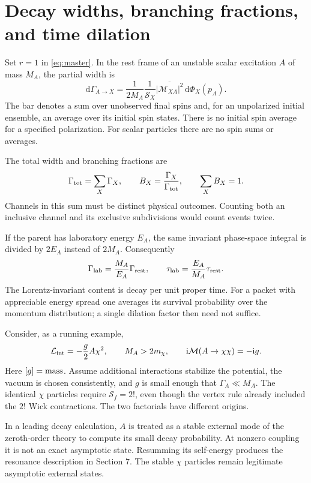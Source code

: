 \documentclass[11pt]{article}
\newcommand{\dd}{\mathrm d}
\newcommand{\ii}{\mathrm i}
\newcommand{\Lag}{\mathcal L}
\newcommand{\module}[1]{\clearpage\section{#1}}
\newcommand{\cM}{\mathcal M}
\newcommand{\cS}{\mathcal S}
\begin{document}
\module{Decay widths, branching fractions, and time dilation}
Set \(r=1\) in \eqref{eq:master}. In the rest frame of an unstable scalar
excitation \(A\) of mass \(M_A\), the partial width is
\begin{equation}
 \boxed{\quad \dd\Gamma_{A\to X}
 =\frac{1}{2M_A}\frac{1}{\cS_X}
 \overline{|\cM_{XA}|^2}\,\dd\Phi_X(p_A).\quad}
 \label{eq:width}
\end{equation}
The bar denotes a sum over unobserved final spins and, for an unpolarized
initial ensemble, an average over its initial spin states. There is no
initial spin average for a specified polarization. For scalar particles
there are no spin sums or averages.

The total width and branching fractions are
\begin{equation}
 \Gamma_{\rm tot}=\sum_X\Gamma_X,\qquad
 B_X=\frac{\Gamma_X}{\Gamma_{\rm tot}},\qquad \sum_XB_X=1.
\end{equation}
Channels in this sum must be distinct physical outcomes. Counting both an
inclusive channel and its exclusive subdivisions would count events twice.

If the parent has laboratory energy \(E_A\), the same invariant phase-space
integral is divided by \(2E_A\) instead of \(2M_A\). Consequently
\begin{equation}
 \Gamma_{\rm lab}=\frac{M_A}{E_A}\Gamma_{\rm rest},\qquad
 \tau_{\rm lab}=\frac{E_A}{M_A}\tau_{\rm rest}.
 \label{eq:dilation}
\end{equation}
The Lorentz-invariant content is decay per unit proper time. For a packet
with appreciable energy spread one averages its survival probability over
the momentum distribution; a single dilation factor then need not suffice.

Consider, as a running example,
\begin{equation}
 \Lag_{\rm int}=-\frac{g}{2}A\chi^2,\qquad M_A>2m_\chi,
 \qquad \ii\cM(A\to\chi\chi)=-\ii g.
 \label{eq:decaymodel}
\end{equation}
Here \([g]={\rm mass}\). Assume additional interactions stabilize the
potential, the vacuum is chosen consistently, and \(g\) is small enough
that \(\Gamma_A\ll M_A\). The identical \(\chi\) particles require
\(\cS_f=2!\), even though the vertex rule already included the \(2!\)
Wick contractions. The two factorials have different origins.

\begin{keyidea}
In a leading decay calculation, \(A\) is treated as a stable external mode
of the zeroth-order theory to compute its small decay probability. At
nonzero coupling it is not an exact asymptotic state. Resumming its
self-energy produces the resonance description in Section 7. The stable
\(\chi\) particles remain legitimate asymptotic external states.
\end{keyidea}
\end{document}
